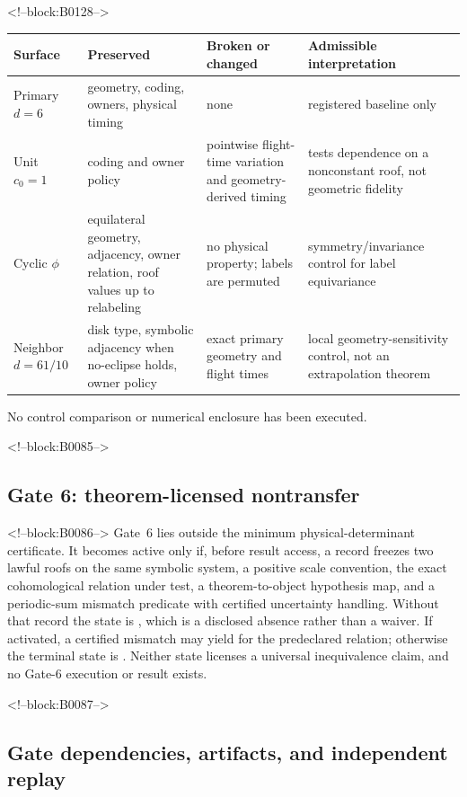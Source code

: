 \documentclass[11pt,a4paper]{article}
\begin{document}
<!--block:B0128-->
\begin{center}
\small
\begin{tabularx}{\linewidth}{@{}lXXX@{}}
\toprule
Surface & Preserved & Broken or changed & Admissible interpretation \\
\midrule
Primary \(d=6\) & geometry, coding, owners, physical timing & none & registered baseline only \\
Unit \(c_0=1\) & coding and owner policy & pointwise flight-time variation and geometry-derived timing & tests dependence on a nonconstant roof, not geometric fidelity \\
Cyclic \(\phi\) & equilateral geometry, adjacency, owner relation, roof values up to relabeling & no physical property; labels are permuted & symmetry/invariance control for label equivariance \\
Neighbor \(d=61/10\) & disk type, symbolic adjacency when no-eclipse holds, owner policy & exact primary geometry and flight times & local geometry-sensitivity control, not an extrapolation theorem \\
\bottomrule
\end{tabularx}
\end{center}
No control comparison or numerical enclosure has been executed.

<!--block:B0085-->
\subsection{Gate 6: theorem-licensed nontransfer}

<!--block:B0086-->
Gate~6 lies outside the minimum physical-determinant certificate. It becomes active only if, before result access, a record freezes two lawful roofs on the same symbolic system, a positive scale convention, the exact cohomological relation under test, a theorem-to-object hypothesis map, and a periodic-sum mismatch predicate with certified uncertainty handling. Without that record the state is , which is a disclosed absence rather than a waiver. If activated, a certified mismatch may yield  for the predeclared relation; otherwise the terminal state is . Neither state licenses a universal inequivalence claim, and no Gate-6 execution or result exists.

<!--block:B0087-->
\subsection{Gate dependencies, artifacts, and independent replay}
\end{document}
